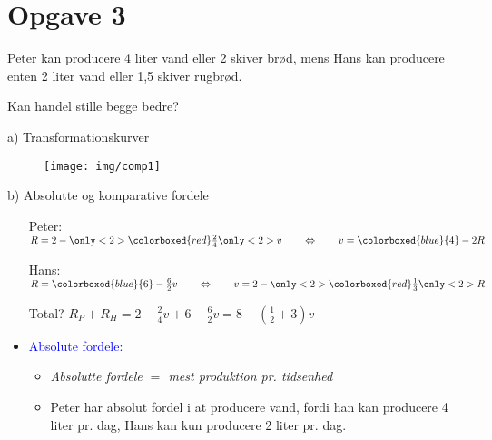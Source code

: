 \section{Opgave 3}

\begin{frame}
Peter kan producere 4 liter vand eller 2 skiver brød, mens Hans kan producere enten 2 liter vand eller 1,5 skiver rugbrød.

Kan handel stille begge bedre?
\end{frame}

\begin{frame}{a) Transformationskurver}

    \begin{figure}
    \centering
        \texttt{[image: img/comp1]}
  \end{figure}

\end{frame}


\begin{frame}{b) Absolutte og komparative fordele}


  \begin{itemize}
    \item[Peter:] $R = 2 - \only<2>{\colorboxed{red}} {\frac{2}{4} \only<2>{}} v \qquad \Leftrightarrow \qquad v = \colorboxed{blue}{4}-2R$
    \item[Hans:] $R = \colorboxed{blue}{6} - \frac{6}{2}v \qquad \Leftrightarrow \qquad v = 2 - \only<2>{\colorboxed{red}}{\frac{1}{3} \only<2>{}}R$
    \item[]
    \item[Total?] $R_P + R_H = 2 - \frac{2}{4}v +  6 - \frac{6}{2}v = 8 - (\frac{1}{2} + 3)v$
  \end{itemize}

\begin{itemize}
  \item \textcolor{blue}{Absolute fordele:}
  \begin{itemize}
    \item \textit{Absolutte fordele $=$ mest produktion pr. tidsenhed}
    \item Peter har absolut fordel i at producere vand, fordi han kan producere 4 liter pr. dag, Hans kan kun producere 2 liter pr. dag.
  \end{itemize}
\end{itemize}

\end{frame}

